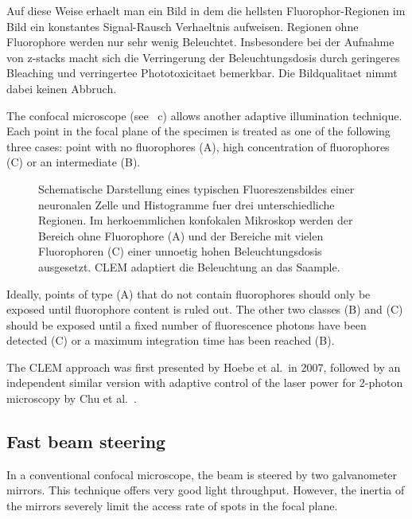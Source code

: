 Auf diese Weise erhaelt man ein Bild in dem die hellsten
Fluorophor-Regionen im Bild ein konstantes Signal-Rausch Verhaeltnis
aufweisen. Regionen ohne Fluorophore werden nur sehr wenig
Beleuchtet. Insbesondere bei der Aufnahme von z-stacks macht sich die
Verringerung der Beleuchtungsdosis durch geringeres Bleaching und
verringertee Phototoxicitaet bemerkbar. Die Bildqualitaet nimmt dabei
keinen Abbruch.


The confocal microscope (see ~c)
allows another adaptive illumination technique. Each point in the
focal plane of the specimen is treated as one of the following three
cases: point with no fluorophores (A), high concentration of
fluorophores (C) or an intermediate (B).
\begin{figure}[hbtp]
  \centering
  \caption{Schematische Darstellung eines typischen Fluoreszensbildes
    einer neuronalen Zelle und Histogramme fuer drei unterschiedliche
    Regionen. Im herkoemmlichen konfokalen Mikroskop werden der
    Bereich ohne Fluorophore (A) und der Bereiche mit vielen
    Fluorophoren (C) einer unnoetig hohen Beleuchtungsdosis
    ausgesetzt. CLEM adaptiert die Beleuchtung an das Saample.}
  \label{fig:clem}
\end{figure}

Ideally, points of type (A) that do not contain fluorophores should
only be exposed until fluorophore content is ruled out. The other two
classes (B) and (C) should be exposed until a fixed number of
fluorescence photons have been detected (C) or a maximum integration
time has been reached (B).


The CLEM approach was first presented by Hoebe et al.\ in 2007,
followed by an independent similar version with adaptive control of
the laser power for 2-photon microscopy by Chu et al.\
\citep{Hoebe2007,Chu2007}.

\subsection{Fast beam steering}
In a conventional confocal microscope, the beam is steered by two
galvanometer mirrors. This technique offers very good light
throughput. However, the inertia of the mirrors severely limit the
access rate of spots in the focal plane.

